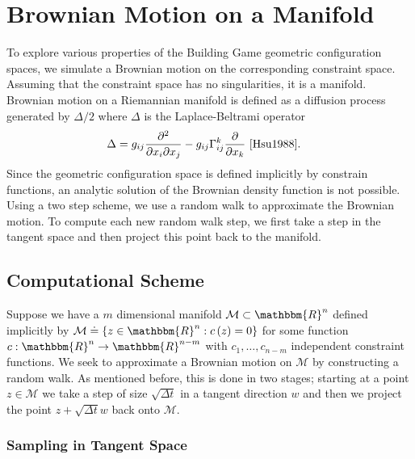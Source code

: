 %
\section{Brownian Motion on a Manifold}

To explore various properties of the Building Game geometric configuration spaces, we simulate a Brownian motion on the corresponding constraint space. Assuming that the constraint space has no singularities, it is a manifold. Brownian motion on a Riemannian manifold is defined as a diffusion process generated by $\Delta /2$ where $\Delta$ is the Laplace-Beltrami operator%
\begin{align}
\Delta &= g_{ij}\frac{\partial^2}{\partial x_i \partial x_j} - g_{ij}\Gamma^k_{ij}\frac{\partial}{\partial x_k}~\cite{Hsu1988}.
\end{align}
Since the geometric configuration space is defined implicitly by constrain functions, an analytic solution of the Brownian density function is not possible. Using a two step scheme, we use a random walk to approximate the Brownian motion. To compute each new random walk step, we first take a step in the tangent space and then project this point back to the manifold. 

\subsection{Computational Scheme}

Suppose we have a $m$ dimensional manifold $\mathcal{M} \subset \mathbbm{R}^n$ defined implicitly by $\mathcal{M} \doteq \left\{z \in \mathbbm{R}^n : c\left(z\right) = 0\right\}$ for some function $c: \mathbbm{R}^n \to \mathbbm{R}^{n-m}$ with $c_1,\dots,c_{n-m}$ independent constraint functions. We seek to approximate a Brownian motion on $\mathcal{M}$ by constructing a random walk. As mentioned before, this is done in two stages; starting at a point $z \in \mathcal{M}$ we take a step of size $\sqrt{\Delta t}$ in a tangent direction $w$ and then we project the point $z +\sqrt{\Delta t} w$ back onto $\mathcal{M}$. 

\subsubsection{Sampling in Tangent Space}  

